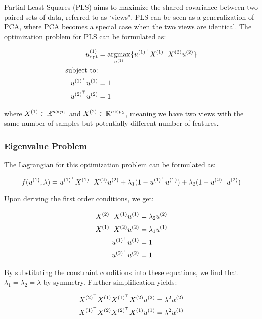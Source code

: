 Partial Least Squares (PLS)\cite{wold1975path} aims to maximize the shared covariance between two paired sets of data, referred to as `views". PLS can be seen as a generalization of PCA, where PCA becomes a special case when the two views are identical. The optimization problem for PLS can be formulated as:

\begin{align}
     u^{(1)}_{\text{opt}} &= \underset{u^{(1)}}{\mathrm{argmax}} \{ u^{(1)^{\top}} X^{(1)^{\top}} X^{(2)} u^{(2)} \} \\
     \text{subject to:} \notag \\
     u^{(1)^{\top}}u^{(1)} &= 1 \notag \\
     u^{(2)^{\top}}u^{(2)} &= 1 \notag
\end{align}

where \( X^{(1)} \in \mathbb{R}^{n \times p_1} \) and \( X^{(2)} \in \mathbb{R}^{n \times p_2} \), meaning we have two views with the same number of samples but potentially different number of features.

\subsubsection{Eigenvalue Problem}

The Lagrangian for this optimization problem can be formulated as:

\begin{equation}
f(u^{(1)}, \lambda) = u^{(1)^{\top}} X^{(1)^{\top}} X^{(2)} u^{(2)} + \lambda_1 (1 - u^{(1)^{\top}}u^{(1)}) + \lambda_2 (1 - u^{(2)^{\top}}u^{(2)})
\end{equation}

Upon deriving the first order conditions, we get:

\begin{align}
    X^{(2)^{\top}} X^{(1)} u^{(1)} &= \lambda_2 u^{(2)} \\
    X^{(1)^{\top}} X^{(2)} u^{(2)} &= \lambda_1 u^{(1)} \\
    u^{(1)^{\top}}u^{(1)} &= 1 \\
    u^{(2)^{\top}}u^{(2)} &= 1
\end{align}

By substituting the constraint conditions into these equations, we find that \( \lambda_1 = \lambda_2 = \lambda \) by symmetry. Further simplification yields:

\begin{align}
    X^{(2)^{\top}}X^{(1)} X^{(1)^{\top}} X^{(2)} u^{(2)} &= \lambda^2 u^{(2)} \\
    X^{(1)^{\top}}X^{(2)} X^{(2)^{\top}} X^{(1)} u^{(1)} &= \lambda^2 u^{(1)}
\end{align}

